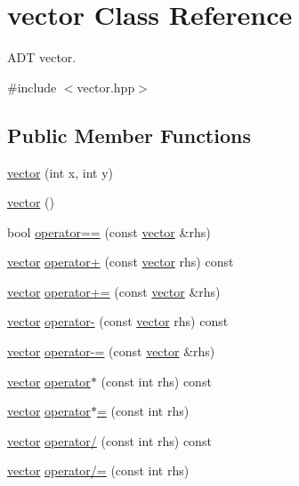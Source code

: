 \hypertarget{classvector}{}\section{vector Class Reference}
\label{classvector}


A\+DT vector.  




{\ttfamily \#include $<$vector.\+hpp$>$}

\subsection*{Public Member Functions}
\begin{DoxyCompactItemize}
\item 
\hyperlink{classvector_a7fa147d3199381b9d8b32753bd1a6968}{vector} (int x, int y)
\item 
\hyperlink{classvector_a28ed60409cde794caea6a40ec8d832b2}{vector} ()
\item 
bool \hyperlink{classvector_a7a25ae23c15974286951c24822c0b7ff}{operator==} (const \hyperlink{classvector}{vector} \&rhs)
\item 
\hyperlink{classvector}{vector} \hyperlink{classvector_a40ddf0da0a5525e90a46ce33cd7a866a}{operator+} (const \hyperlink{classvector}{vector} rhs) const 
\item 
\hyperlink{classvector}{vector} \hyperlink{classvector_ad62f9ffeab2c2b5963ca90092b89d525}{operator+=} (const \hyperlink{classvector}{vector} \&rhs)
\item 
\hyperlink{classvector}{vector} \hyperlink{classvector_ae9c85ef402421e7a14cad83c1b596f38}{operator-\/} (const \hyperlink{classvector}{vector} rhs) const 
\item 
\hyperlink{classvector}{vector} \hyperlink{classvector_a3e73e3ef763da682e157866d641b9c33}{operator-\/=} (const \hyperlink{classvector}{vector} \&rhs)
\item 
\hyperlink{classvector}{vector} \hyperlink{classvector_a07aa14ad63e3f0281c1af5ef594b0a12}{operator$\ast$} (const int rhs) const 
\item 
\hyperlink{classvector}{vector} \hyperlink{classvector_a2e96cf517c90d9cdb8c1160c1295051b}{operator$\ast$=} (const int rhs)
\item 
\hyperlink{classvector}{vector} \hyperlink{classvector_a27d19ecae377502ac3d2c0c39837ebcf}{operator/} (const int rhs) const 
\item 
\hyperlink{classvector}{vector} \hyperlink{classvector_a863c36e83b65a4e18e246be15a488803}{operator/=} (const int rhs)
\end{DoxyCompactItemize}

